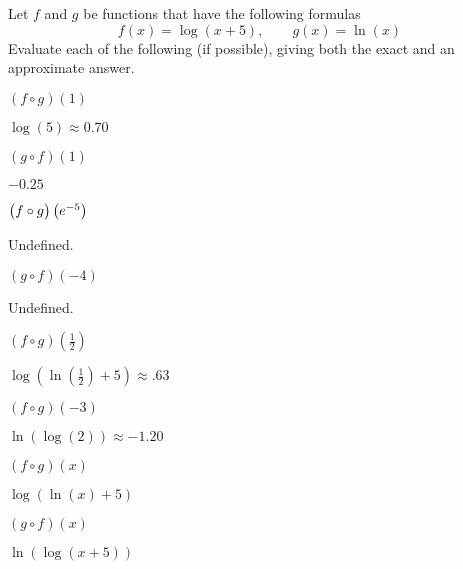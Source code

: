 \begin{exercises}
\begin{problem}
Let $f$ and $g$ be functions that have the following formulas
\[
	f(x)=\log(x+5), \qquad g(x)=\ln(x)
\]
Evaluate each of the following (if possible), giving both the exact 
and an approximate answer.
\begin{multicols}{4}
	\begin{subproblem}
		$(f\circ g)(1)$ 
		\begin{shortsolution}
			$\log(5)\approx 0.70$ 
		\end{shortsolution}
	\end{subproblem}
	\begin{subproblem}
		$(g\circ f)(1)$ 
		\begin{shortsolution}
			$-0.25$ 
		\end{shortsolution}
	\end{subproblem}
	\begin{subproblem}
		$\left(f\circ g \vphantom{e^{-5}}\right)\left( e^{-5} \right)$ 
		\begin{shortsolution}
			Undefined. 
		\end{shortsolution}
	\end{subproblem}
	\begin{subproblem}
		$(g\circ f)(-4)$ 
		\begin{shortsolution}
			Undefined. 
		\end{shortsolution}
	\end{subproblem}
	\begin{subproblem}
		$(f\circ g)\left( \frac{1}{2} \right)$ 
		\begin{shortsolution}
			$\log\left( \ln\left( \frac{1}{2} \right)+5 \right)\approx .63$ 
		\end{shortsolution}
	\end{subproblem}
	\begin{subproblem}
		$(f\circ g)(-3)$ 
		\begin{shortsolution}
			$\ln(\log(2))\approx -1.20$ 
		\end{shortsolution}
	\end{subproblem}
	\begin{subproblem}
		$(f\circ g)(x)$ 
		\begin{shortsolution}
			$\log(\ln(x)+5)$ 
		\end{shortsolution}
	\end{subproblem}
	\begin{subproblem}
		$(g\circ f)(x)$
		\begin{shortsolution}
			$\ln(\log(x+5))$ 
		\end{shortsolution}
	\end{subproblem}
\end{multicols}
\end{problem}


\end{exercises}

